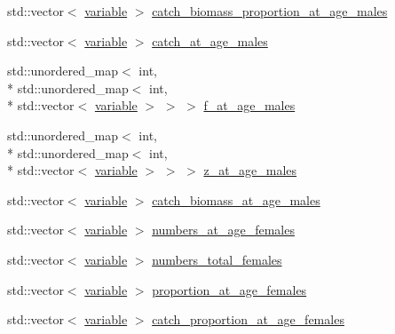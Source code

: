 \begin{DoxyCompactItemize}
\item 
std\-::vector$<$ \hyperlink{structmas_1_1_fleet_a1902d0842cb7ce9b9bdd4be013e709a9}{variable} $>$ \hyperlink{structmas_1_1_fleet_aa15871c1252f3fc4f0d5eb19376ef18c}{catch\-\_\-biomass\-\_\-proportion\-\_\-at\-\_\-age\-\_\-males}
\item 
std\-::vector$<$ \hyperlink{structmas_1_1_fleet_a1902d0842cb7ce9b9bdd4be013e709a9}{variable} $>$ \hyperlink{structmas_1_1_fleet_a384cc77fb80ba8d2d91722468839ea5d}{catch\-\_\-at\-\_\-age\-\_\-males}
\item 
std\-::unordered\-\_\-map$<$ int, \\*
std\-::unordered\-\_\-map$<$ int, \\*
std\-::vector$<$ \hyperlink{structmas_1_1_fleet_a1902d0842cb7ce9b9bdd4be013e709a9}{variable} $>$ $>$ $>$ \hyperlink{structmas_1_1_fleet_a1019367ebec70e8480fa5bcf76851d6f}{f\-\_\-at\-\_\-age\-\_\-males}
\item 
std\-::unordered\-\_\-map$<$ int, \\*
std\-::unordered\-\_\-map$<$ int, \\*
std\-::vector$<$ \hyperlink{structmas_1_1_fleet_a1902d0842cb7ce9b9bdd4be013e709a9}{variable} $>$ $>$ $>$ \hyperlink{structmas_1_1_fleet_a177b878b912cd2c01729070c46e0f27d}{z\-\_\-at\-\_\-age\-\_\-males}
\item 
std\-::vector$<$ \hyperlink{structmas_1_1_fleet_a1902d0842cb7ce9b9bdd4be013e709a9}{variable} $>$ \hyperlink{structmas_1_1_fleet_a21e595437d97bf9d2197cf2bdddcc7a0}{catch\-\_\-biomass\-\_\-at\-\_\-age\-\_\-males}
\item 
std\-::vector$<$ \hyperlink{structmas_1_1_fleet_a1902d0842cb7ce9b9bdd4be013e709a9}{variable} $>$ \hyperlink{structmas_1_1_fleet_afbe9209cae969e13ee6480efab603e02}{numbers\-\_\-at\-\_\-age\-\_\-females}
\item 
std\-::vector$<$ \hyperlink{structmas_1_1_fleet_a1902d0842cb7ce9b9bdd4be013e709a9}{variable} $>$ \hyperlink{structmas_1_1_fleet_a18952440bdaafdde0b75dd313ad542f5}{numbers\-\_\-total\-\_\-females}
\item 
std\-::vector$<$ \hyperlink{structmas_1_1_fleet_a1902d0842cb7ce9b9bdd4be013e709a9}{variable} $>$ \hyperlink{structmas_1_1_fleet_a8d2308d55f6d12305f288caefe6cac1a}{proportion\-\_\-at\-\_\-age\-\_\-females}
\item 
std\-::vector$<$ \hyperlink{structmas_1_1_fleet_a1902d0842cb7ce9b9bdd4be013e709a9}{variable} $>$ \hyperlink{structmas_1_1_fleet_a6fc705bf1cfbe3641f610a98bc57402d}{catch\-\_\-proportion\-\_\-at\-\_\-age\-\_\-females}
\item 

\end{DoxyCompactItemize}
